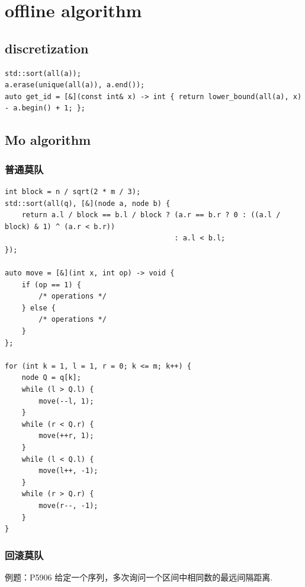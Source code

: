 \documentclass[UTF8, a4paper, titlepage, twoside]{ctexart}
\begin{document}
\newpage
\section{ offline algorithm}
\subsection{ discretization }
\begin{lstlisting}[style=cpp]
std::sort(all(a));
a.erase(unique(all(a)), a.end());
auto get_id = [&](const int& x) -> int { return lower_bound(all(a), x) - a.begin() + 1; };
\end{lstlisting}

\subsection{ Mo algorithm }
\subsubsection*{ 普通莫队 }
\begin{lstlisting}[style=cpp]
int block = n / sqrt(2 * m / 3);
std::sort(all(q), [&](node a, node b) {
    return a.l / block == b.l / block ? (a.r == b.r ? 0 : ((a.l / block) & 1) ^ (a.r < b.r))
                                        : a.l < b.l;
});

auto move = [&](int x, int op) -> void {
    if (op == 1) {
        /* operations */
    } else {
        /* operations */
    }
};

for (int k = 1, l = 1, r = 0; k <= m; k++) {
    node Q = q[k];
    while (l > Q.l) {
        move(--l, 1);
    }
    while (r < Q.r) {
        move(++r, 1);
    }
    while (l < Q.l) {
        move(l++, -1);
    }
    while (r > Q.r) {
        move(r--, -1);
    }
}
\end{lstlisting}

\subsubsection*{ 回滚莫队 }

例题：P5906 给定一个序列，多次询问一个区间中相同数的最远间隔距离.
\end{document}
